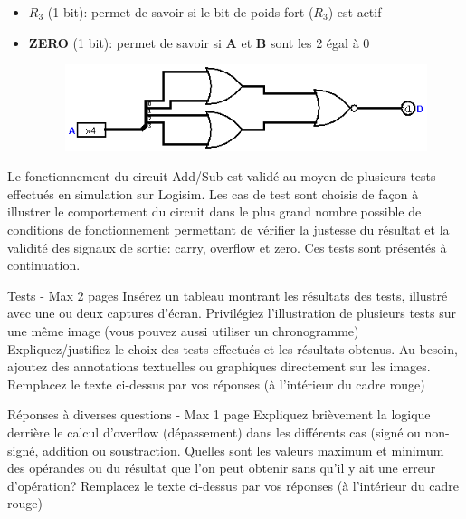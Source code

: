 \documentclass[a4paper]{article}
\begin{document}
\begin{tcolorbox}[colframe=Monokaimagenta,colback=white]
\begin{itemize}
\item $R_3$ (1 bit): permet de savoir si le bit de poids fort ($R_3$) est actif 
\item \textbf{ZERO} (1 bit): permet de savoir si \textbf{A} et \textbf{B} sont les 2 égal à 0
\begin{figure}[H]
    \centering
    \includegraphics[scale=0.4]{src/ISZERO_4BITS.png}
\end{figure}
\end{itemize}   



 
    
    
\end{tcolorbox}

Le fonctionnement du circuit Add/Sub est validé au moyen de plusieurs tests effectués en  simulation sur Logisim. Les cas de test sont choisis de façon à illustrer le comportement du circuit dans le plus grand nombre possible de conditions de fonctionnement permettant de vérifier la justesse du résultat et la validité des signaux de sortie: carry, overflow et zero. Ces tests sont présentés à continuation.

\begin{tcolorbox}[colframe=Monokaimagenta,colback=white]
Tests - Max 2 pages 
Insérez  un tableau montrant les résultats des tests, illustré avec une ou deux captures d’écran. Privilégiez l’illustration de plusieurs tests sur une même image (vous pouvez aussi utiliser un chronogramme)
Expliquez/justifiez le choix des tests effectués et les résultats obtenus.
Au besoin, ajoutez des annotations textuelles ou graphiques directement sur les images.
Remplacez le texte ci-dessus par vos réponses (à l’intérieur du cadre rouge)
\end{tcolorbox}

\begin{tcolorbox}[colframe=Monokaimagenta,colback=white]
Réponses à diverses questions - Max 1 page
Expliquez brièvement la logique derrière le calcul d’overflow (dépassement) dans les différents cas (signé ou non-signé, addition ou soustraction.
Quelles sont les valeurs maximum et minimum des opérandes ou du résultat que l’on peut obtenir sans qu’il y ait une erreur d’opération?
Remplacez le texte ci-dessus par vos réponses (à l’intérieur du cadre rouge)
\end{tcolorbox}
\end{document}
